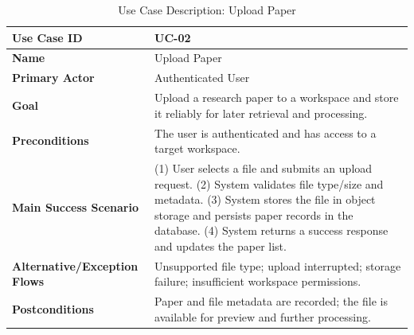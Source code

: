 \begin{table}[H]
    \centering
    \small
    \begin{tabularx}{\textwidth}{|l|X|}
        \hline
        \textbf{Use Case ID}                 & UC-02                                                                                                                                                                                                                                                               \\
        \hline
        \textbf{Name}                        & Upload Paper                                                                                                                                                                                                                                                        \\
        \hline
        \textbf{Primary Actor}               & Authenticated User                                                                                                                                                                                                                                                  \\
        \hline
        \textbf{Goal}                        & Upload a research paper to a workspace and store it reliably for later retrieval and processing.                                                                                                                                                                    \\
        \hline
        \textbf{Preconditions}               & The user is authenticated and has access to a target workspace.                                                                                                                                                                                                     \\
        \hline
        \textbf{Main Success Scenario}       & (1) User selects a file and submits an upload request. (2) System validates file type/size and metadata. (3) System stores the file in object storage and persists paper records in the database. (4) System returns a success response and updates the paper list. \\
        \hline
        \textbf{Alternative/Exception Flows} & Unsupported file type; upload interrupted; storage failure; insufficient workspace permissions.                                                                                                                                                                     \\
        \hline
        \textbf{Postconditions}              & Paper and file metadata are recorded; the file is available for preview and further processing.                                                                                                                                                                     \\
        \hline
    \end{tabularx}
    \caption{Use Case Description: Upload Paper}
    \label{tab:uc-02}
\end{table}

